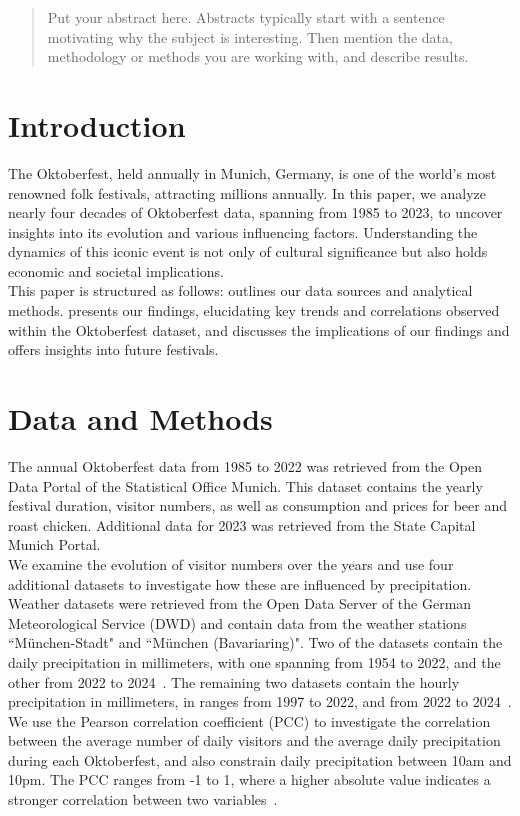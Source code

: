 \documentclass{article}
\theoremstyle{plain}
\theoremstyle{definition}
\theoremstyle{remark}
\begin{document}
\printAffiliationsAndNotice{\icmlEqualContribution} %

\begin{abstract}
Put your abstract here. Abstracts typically start with a sentence motivating why the subject is interesting. Then mention the data, methodology or methods you are working with, and describe results. 
\end{abstract}

\section{Introduction}\label{sec:intro}


 The Oktoberfest, held annually in Munich, Germany, is one of the world's most renowned folk festivals, attracting millions annually. In this paper, we analyze nearly four decades of Oktoberfest data, spanning from 1985 to 2023, to uncover insights into its evolution and various influencing factors. Understanding the dynamics of this iconic event is not only of cultural significance but also holds economic and societal implications. \\
 This paper is structured as follows:  outlines our data sources and analytical methods.  presents our findings, elucidating key trends and correlations observed within the Oktoberfest dataset, and  discusses the implications of our findings and offers insights into future festivals.\\

\section{Data and Methods}\label{sec:methods}
The annual Oktoberfest data from 1985 to 2022 was retrieved from the Open Data Portal of the Statistical Office Munich. This dataset contains the yearly festival duration, visitor numbers, as well as consumption and prices for beer and roast chicken. Additional data for 2023 was retrieved from the State Capital Munich Portal. \\
We examine the evolution of visitor numbers over the years and use four additional datasets to investigate how these are influenced by precipitation. Weather datasets were retrieved from the Open Data Server of the German Meteorological Service (DWD) and contain data from the weather stations ``München-Stadt" and ``München (Bavariaring)". Two of the datasets contain the daily precipitation in millimeters, with one spanning from 1954 to 2022, and the other from 2022 to 2024~\citep{3,4}. The remaining two datasets contain the hourly precipitation in millimeters, in ranges from 1997 to 2022, and from 2022 to 2024~\citep{1,2}. We use the Pearson correlation coefficient (PCC) to investigate the correlation between the average number of daily visitors and the average daily precipitation during each Oktoberfest, and also constrain daily precipitation between 10am and 10pm. The PCC ranges from -1 to 1, where a higher absolute value indicates a stronger correlation between two variables~\cite{thonield}.\\
\end{document}
